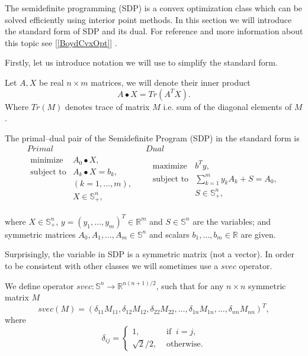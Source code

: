 \documentclass[12pt]{book}
\theoremstyle{definition}
\begin{document}
The semidefinite programming (SDP) is a convex optimization class which can be solved efficiently using interior point methods. In this section we will introduce the standard form of SDP and its dual. For reference and more information about this topic see [\ref{BoydCvxOpt}] .


Firstly, let us introduce notation we will use to simplify the standard form.

\label{defBullet}
Let $A,X$ be real $n\times m$ matrices, we will denote their inner product 
$$A\bullet X = Tr(A^TX).$$
Where $Tr(M)$ denotes trace of matrix $M$ i.e. sum of the diagonal elements of $M$.

\label{defSDP}
The primal--dual pair of the Semidefinite Program (SDP) in the standard form is
\begin{equation}
\label{sdp} 
\begin{array}{cc}
Primal & Dual \\
\begin{array}{ll}
\mbox{minimize} & A_0\bullet X,\\
\mbox{subject to}& A_k\bullet X  = b_k, \ \\
 & ( k = 1,\dots ,m), \\
& X \in \mathbb{S}^n_+,
\end{array}
\ \  &  \ \
\begin{array}{ll}
\mbox{maximize} & b^Ty, \\
\mbox{subject to}& \sum_{k=1}^m y_kA_k + S  = A_0 ,\\
& S \in \mathbb{S}^n_+,
\end{array}
\end{array}
\end{equation}

where $X\in \mathbb{S}^n_+$, $y = (y_1,\dots ,y_m)^T\in \mathbb{R}^m$ and $S\in \mathbb{S}^n$ are the variables; and symmetric matrices $A_0 , A_1,\dots , A_m \in \mathbb{S}^n$ and scalars $b_1,\dots, b_m \in \mathbb{R}$ are given.


Surprisingly, the variable in SDP is a symmetric matrix (not a vector). 
In order to be consistent with other classes we will sometimes use a $svec$ operator.  

 \label{svec}
We define operator $svec: \mathbb{S}^n \rightarrow \mathbb{R}^{n(n+1)/2}$, such that for any $n\times n$ symmetric matrix $M$
\begin{equation}
	svec(M) = ( \delta_{11}M_{11},\delta_{12}M_{12},\delta_{22}M_{22},\dots ,\delta_{1n}M_{1n},\dots ,\delta_{nn}M_{nn})^T,
\end{equation}
where
\begin{equation}
	\delta_{ij}= \left\lbrace 
	\begin{array}{ll} 
		1, &\mbox{ if }\ i=j, \\ 
		\sqrt{2}/2, &\mbox{ otherwise.} 
	\end{array} \right.
\end{equation}
\end{document}
